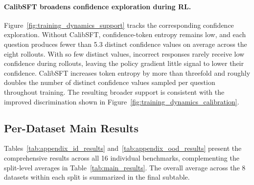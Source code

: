 \documentclass{article} %
\begin{document}
\paragraph{CalibSFT broadens confidence exploration during RL.}
Figure~\ref{fig:training_dynamics_support} tracks the corresponding
confidence exploration.
Without CalibSFT, confidence-token entropy remains low, and each
question produces fewer than 5.3 distinct confidence values on
average across the eight rollouts.
With so few distinct values, incorrect responses rarely receive low
confidence during rollouts, leaving the policy gradient little signal to
lower their confidence.
CalibSFT increases token entropy by more than threefold and roughly
doubles the number of distinct confidence values sampled per
question throughout training.
The resulting broader support is consistent with the improved
discrimination shown in Figure~\ref{fig:training_dynamics_calibration}.



\subsection{Per-Dataset Main Results}
\label{sec:per_dataset_results}
Tables~\ref{tab:appendix_id_results} and~\ref{tab:appendix_ood_results} 
present the comprehensive results across all 16 individual benchmarks, 
complementing the split-level averages in Table~\ref{tab:main_results}. 
The overall average across the 8 datasets within each split is summarized in the final subtable.
\end{document}
